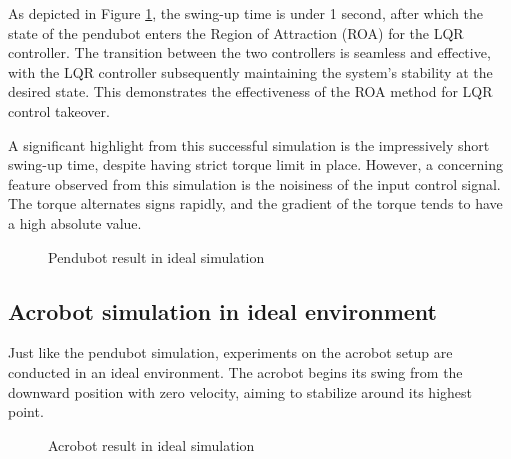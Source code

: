As depicted in Figure \ref{fig:ideal_simulation_pendubot}, the swing-up time is under 1 second, after which the state of the pendubot enters the Region of Attraction (ROA) for the LQR controller. The transition between the two controllers is seamless and effective, with the LQR controller subsequently maintaining the system's stability at the desired state. This demonstrates the effectiveness of the ROA method for LQR control takeover.

A significant highlight from this successful simulation is the impressively short swing-up time, despite having strict torque limit in place. However, a concerning feature observed from this simulation is the noisiness of the input control signal. The torque alternates signs rapidly, and the gradient of the torque tends to have a high absolute value.

\begin{figure}[H]
    \centering
    \caption{Pendubot result in ideal simulation }
    \label{fig:ideal_simulation_pendubot}
\end{figure}

\subsection{Acrobot simulation in ideal environment}

Just like the pendubot simulation, experiments on the acrobot setup are conducted in an ideal environment. The acrobot begins its swing from the downward position with zero velocity, aiming to stabilize around its highest point.

\begin{figure}[H]
    \centering
    \caption{Acrobot result in ideal simulation}
    \label{fig:ideal_simulation_acrobot}
\end{figure}

